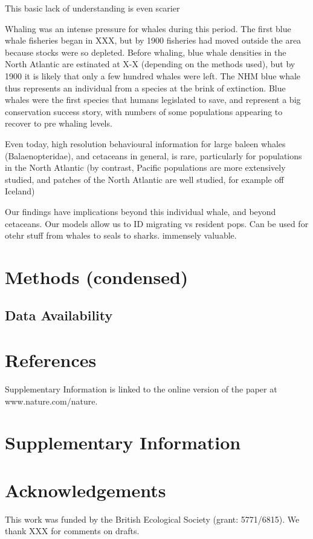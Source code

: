 \documentclass[a4paper,12pt]{article}
\begin{document}
This basic lack of understanding is even scarier

Whaling was an intense pressure for whales during this period. The first blue whale fisheries began in XXX, but by 1900 fisheries had moved outside the area because stocks were so depleted. Before whaling, blue whale densities in the North Atlantic are estinated at X-X (depending on the methods used), but by 1900 it is likely that only a few hundred whales were left. The NHM blue whale thus represents an individual from a species at the brink of extinction. Blue whales were the first species that humans legislated to save, and represent a big conservation success story, with numbers of some populations appearing to recover to pre whaling levels.

Even today, high resolution behavioural information for large baleen whales (Balaenopteridae), and cetaceans in general, is rare, particularly for populations in the North Atlantic (by contrast, Pacific populations are more extensively studied, and patches of the North Atlantic are well studied, for example off Iceland)

Our findings have implications beyond this individual whale, and beyond cetaceans. Our models allow us  to ID migrating vs resident pops. Can be used for otehr stuff from whales to seals to sharks. immensely valuable.

\section{Methods (condensed)}

\subsection{Data Availability}

\section{References}

%
%

Supplementary Information is linked to the online version of the paper at www.nature.com/nature.

\section{Supplementary Information}

\section{Acknowledgements}
This work was funded by the British Ecological Society (grant: 5771/6815). 
We thank XXX for comments on drafts.
\end{document}

